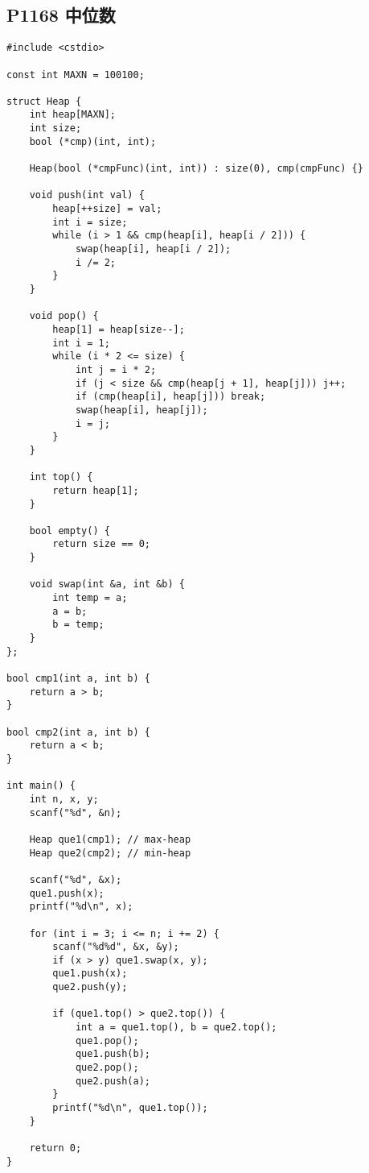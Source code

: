 \documentclass{ctexart}
\begin{document}
\subsection{P1168 中位数}

\begin{lstlisting}
#include <cstdio>

const int MAXN = 100100;

struct Heap {
    int heap[MAXN];
    int size;
    bool (*cmp)(int, int);

    Heap(bool (*cmpFunc)(int, int)) : size(0), cmp(cmpFunc) {}

    void push(int val) {
        heap[++size] = val;
        int i = size;
        while (i > 1 && cmp(heap[i], heap[i / 2])) {
            swap(heap[i], heap[i / 2]);
            i /= 2;
        }
    }

    void pop() {
        heap[1] = heap[size--];
        int i = 1;
        while (i * 2 <= size) {
            int j = i * 2;
            if (j < size && cmp(heap[j + 1], heap[j])) j++;
            if (cmp(heap[i], heap[j])) break;
            swap(heap[i], heap[j]);
            i = j;
        }
    }

    int top() {
        return heap[1];
    }

    bool empty() {
        return size == 0;
    }

    void swap(int &a, int &b) {
        int temp = a;
        a = b;
        b = temp;
    }
};

bool cmp1(int a, int b) {
    return a > b;
}

bool cmp2(int a, int b) {
    return a < b;
}

int main() {
    int n, x, y;
    scanf("%d", &n);

    Heap que1(cmp1); // max-heap
    Heap que2(cmp2); // min-heap

    scanf("%d", &x);
    que1.push(x);
    printf("%d\n", x);

    for (int i = 3; i <= n; i += 2) {
        scanf("%d%d", &x, &y);
        if (x > y) que1.swap(x, y);
        que1.push(x);
        que2.push(y);

        if (que1.top() > que2.top()) {
            int a = que1.top(), b = que2.top();
            que1.pop();
            que1.push(b);
            que2.pop();
            que2.push(a);
        }
        printf("%d\n", que1.top());
    }

    return 0;
}

\end{lstlisting}
\end{document}

